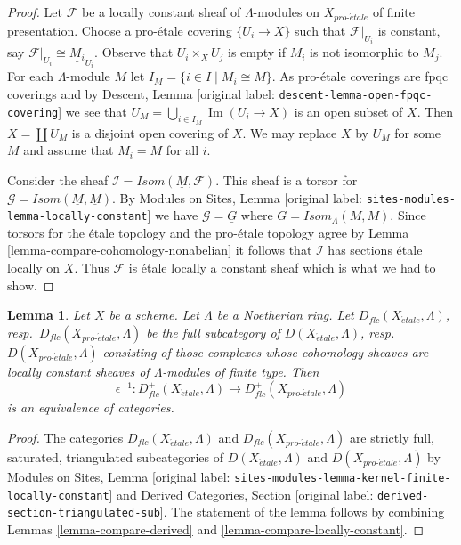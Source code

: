 \documentclass[10pt,a4paper]{article}
\theoremstyle{plain}
\newtheorem{lemma}[subsection]{Lemma}
\theoremstyle{definition}
\theoremstyle{remark}
\numberwithin{equation}{subsection}
\def\proetale{{pro\text{-}\acute{e}tale}}
\def\etale{{\acute{e}tale}}
\def\Im{\mathop{\mathrm{Im}}}
\begin{document}
\begin{proof}
Let $\mathcal{F}$ be a locally constant sheaf of $\Lambda$-modules
on $X_\proetale$ of finite presentation. Choose a pro-\'etale covering
$\{U_i \to X\}$ such that $\mathcal{F}|_{U_i}$ is constant, say
$\mathcal{F}|_{U_i} \cong \underline{M_i}_{U_i}$.
Observe that $U_i \times_X U_j$ is empty if $M_i$ is not isomorphic
to $M_j$.
For each $\Lambda$-module $M$ let $I_M = \{i \in I \mid M_i \cong M\}$.
As pro-\'etale coverings are fpqc coverings and by
Descent, Lemma [original label: \nolinkurl{descent-lemma-open-fpqc-covering}]
we see that $U_M = \bigcup_{i \in I_M} \Im(U_i \to X)$
is an open subset of $X$. Then $X = \coprod U_M$ is a disjoint
open covering of $X$. We may replace $X$ by $U_M$ for some $M$ and
assume that $M_i = M$ for all $i$.

\medskip\noindent
Consider the sheaf $\mathcal{I} = \mathit{Isom}(\underline{M}, \mathcal{F})$.
This sheaf is a torsor for
$\mathcal{G} = \mathit{Isom}(\underline{M}, \underline{M})$.
By Modules on Sites, Lemma [original label: \nolinkurl{sites-modules-lemma-locally-constant}]
we have $\mathcal{G} = \underline{G}$
where $G = \mathit{Isom}_\Lambda(M, M)$.
Since torsors for the \'etale topology
and the pro-\'etale topology agree by
Lemma \ref{lemma-compare-cohomology-nonabelian}
it follows that $\mathcal{I}$ has sections \'etale locally on $X$.
Thus $\mathcal{F}$ is \'etale locally a constant sheaf which is
what we had to show.
\end{proof}

\begin{lemma}
\label{lemma-compare-locally-constant-derived}
Let $X$ be a scheme. Let $\Lambda$ be a Noetherian ring.
Let $D_{flc}(X_\etale, \Lambda)$, resp.\ $D_{flc}(X_\proetale, \Lambda)$
be the full subcategory of
$D(X_\etale, \Lambda)$, resp.\ $D(X_\proetale, \Lambda)$
consisting of those complexes whose cohomology sheaves are locally
constant sheaves of $\Lambda$-modules of finite type. Then
$$
\epsilon^{-1} :
D_{flc}^+(X_\etale, \Lambda)
\longrightarrow
D_{flc}^+(X_\proetale, \Lambda)
$$
is an equivalence of categories.
\end{lemma}

\begin{proof}
The categories $D_{flc}(X_\etale, \Lambda)$ and $D_{flc}(X_\proetale, \Lambda)$
are strictly full, saturated, triangulated subcategories of
$D(X_\etale, \Lambda)$ and $D(X_\proetale, \Lambda)$
by Modules on Sites, Lemma
[original label: \nolinkurl{sites-modules-lemma-kernel-finite-locally-constant}]
and
Derived Categories, Section [original label: \nolinkurl{derived-section-triangulated-sub}].
The statement of the lemma follows by combining
Lemmas \ref{lemma-compare-derived} and
\ref{lemma-compare-locally-constant}.
\end{proof}
\end{document}
